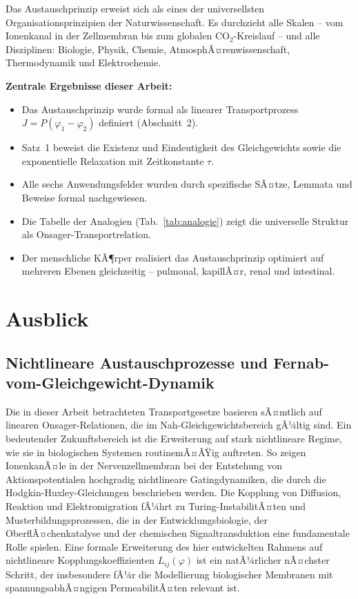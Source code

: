 ﻿\documentclass[a4paper,12pt]{article}
\theoremstyle{definition}
\begin{document}
Das Austauschprinzip erweist sich als eines der universellsten Organisationsprinzipien
der Naturwissenschaft. Es durchzieht alle Skalen -- vom Ionenkanal in der Zellmembran
bis zum globalen CO$_2$-Kreislauf -- und alle Disziplinen: Biologie, Physik, Chemie,
AtmosphÃ¤renwissenschaft, Thermodynamik und Elektrochemie.

\textbf{Zentrale Ergebnisse dieser Arbeit:}
\begin{itemize}
    \item Das Austauschprinzip wurde formal als linearer Transportprozess
          $J = P(\varphi_1 - \varphi_2)$ definiert (Abschnitt~2).
    \item Satz~1 beweist die Existenz und Eindeutigkeit des Gleichgewichts
          sowie die exponentielle Relaxation mit Zeitkonstante $\tau$.
    \item Alle sechs Anwendungsfelder wurden durch spezifische SÃ¤tze, Lemmata
          und Beweise formal nachgewiesen.
    \item Die Tabelle der Analogien (Tab.~\ref{tab:analogie}) zeigt die
          universelle Struktur als Onsager-Transportrelation.
    \item Der menschliche KÃ¶rper realisiert das Austauschprinzip optimiert auf
          mehreren Ebenen gleichzeitig -- pulmonal, kapillÃ¤r, renal und intestinal.
\end{itemize}

\section{Ausblick}

\subsection{Nichtlineare Austauschprozesse und Fernab-vom-Gleichgewicht-Dynamik}

Die in dieser Arbeit betrachteten Transportgesetze basieren sÃ¤mtlich auf linearen
Onsager-Relationen, die im Nah-Gleichgewichtsbereich gÃ¼ltig sind. Ein bedeutender
Zukunftsbereich ist die Erweiterung auf stark nichtlineare Regime, wie sie in
biologischen Systemen routinemÃ¤ÃŸig auftreten. So zeigen IonenkanÃ¤le in der
Nervenzellmembran bei der Entstehung von Aktionspotentialen hochgradig nichtlineare
Gatingdynamiken, die durch die Hodgkin-Huxley-Gleichungen beschrieben werden. Die
Kopplung von Diffusion, Reaktion und Elektromigration fÃ¼hrt zu Turing-InstabilitÃ¤ten
und Musterbildungsprozessen, die in der Entwicklungsbiologie, der OberflÃ¤chenkatalyse
und der chemischen Signaltransduktion eine fundamentale Rolle spielen. Eine formale
Erweiterung des hier entwickelten Rahmens auf nichtlineare Kopplungskoeffizienten
$L_{ij}(\varphi)$ ist ein natÃ¼rlicher nÃ¤chster Schritt, der insbesondere fÃ¼r die
Modellierung biologischer Membranen mit spannungsabhÃ¤ngigen PermeabilitÃ¤ten relevant ist.
\end{document}
